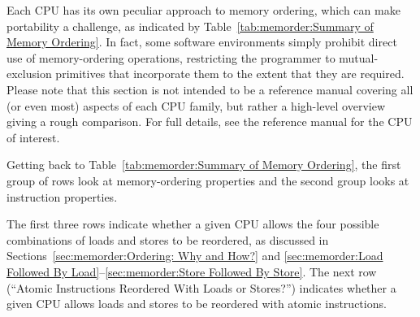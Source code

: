 \begin{table}[tbh]
\vspace{5pt}\hfill
{}\OneColumnHSpace{-0.7in}
\caption{Summary of Memory Ordering}
\label{tab:memorder:Summary of Memory Ordering}
\end{table}

Each CPU has its own peculiar approach to memory ordering, which
can make portability a challenge, as indicated by
Table~\ref{tab:memorder:Summary of Memory Ordering}.
In fact, some software environments simply prohibit
direct use of memory-ordering operations, restricting the programmer
to mutual-exclusion primitives that incorporate them to the extent that
they are required.  Please note that this section is not intended to be
a reference manual
covering all (or even most) aspects of each CPU family, but rather
a high-level overview giving a rough comparison.
For full details, see the reference manual for the CPU of interest.

Getting back to
Table~\ref{tab:memorder:Summary of Memory Ordering},
the first group of rows look at memory-ordering
properties and the second group looks at instruction properties.

The first three rows indicate whether a given CPU allows the four
possible combinations of loads and stores to be reordered, as discussed
in
Sections~\ref{sec:memorder:Ordering: Why and How?} and
\ref{sec:memorder:Load Followed By Load}--\ref{sec:memorder:Store Followed By Store}.
The next row (``Atomic Instructions Reordered With Loads or Stores?'')
indicates whether a given CPU allows loads and stores
to be reordered with atomic instructions.

